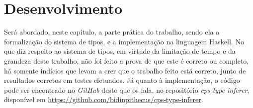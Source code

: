 \chapter{Desenvolvimento}\label{ch:desenvolvimento}

Será abordado, neste capítulo, a parte prática do trabalho, sendo ela a formalização do sistema de tipos, e a implementação na linguagem Haskell.
No que diz respeito ao sistema de tipos, em virtude da limitação de tempo e da grandeza deste trabalho, não foi feito a prova de que este é correto ou completo, há somente indícios que levam a crer que o trabalho feito está correto, junto de resultados corretos em testes efetuados.
Já quanto à implementação, o código pode ser encontrado no \textit{GitHub} deste que os fala, no repositório \textit{cps-type-inferer}, disponível em \url{https://github.com/bidinpithecus/cps-type-inferer}.




